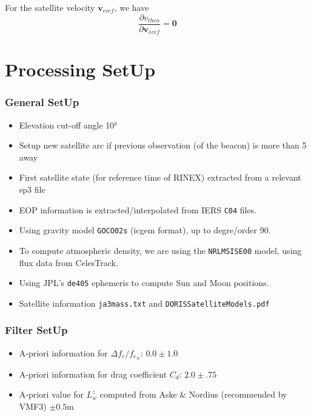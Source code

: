For the satellite velocity $\bm{v}_{ecef}$, we have
\begin{equation}
  \frac{\partial v_{theo}}{\partial \bm{v}_{ecef}} = \bm{0}
  \label{eq:partials-vel}
\end{equation}

\section{Processing SetUp}

\subsubsection{General SetUp}
\begin{itemize}
  \item Elevation cut-off angle \ang{10}
  \item Setup new satellite arc if previous observation (of the beacon) is more 
    than \SI{5}{\min} away
  \item First satellite state (for reference time of RINEX) extracted from a relevant 
    sp3 file
  \item EOP information is extracted/interpolated from IERS \texttt{C04} files.
  \item Using gravity model \texttt{GOCO02s} (icgem format), up to degre/order 90.
  \item To compute atmospheric density, we are using the \texttt{NRLMSISE00} model, 
    using flux data from CelesTrack.
  \item Using JPL's \texttt{de405} ephemeris to compute Sun and Moon positions.
  \item Satellite information \texttt{ja3mass.txt} and \texttt{DORISSatelliteModels.pdf} 
\end{itemize}

\subsubsection{Filter SetUp}
\begin{itemize}
  \item A-priori information for $\Delta f_e / f_{e_N}$: $0.0 \pm 1.0$
  \item A-priori information for drag coefficient $C_{d}$: $2.0 \pm .75$
  \item A-priori value for $L^z_w$ computed from Aske \& Nordius (recommended by VMF3) $\pm 0.5 \si{\m}$
\end{itemize}



